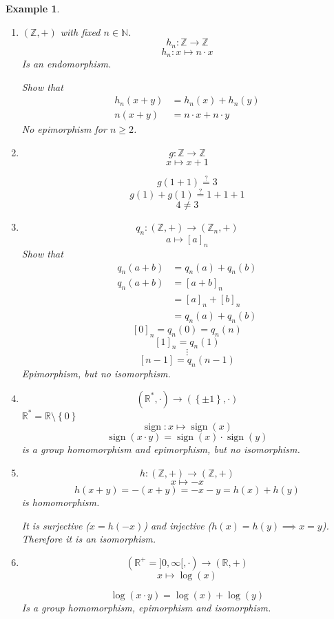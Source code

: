 \documentclass[a4paper,landscape,twocolumn]{article}
\newcommand\set[1]{\left\{#1\right\}}
\newtheorem{ex}{Example}[section]
\begin{document}
\begin{ex}
  \begin{enumerate}
    \item $(\mathbb Z, +)$ with fixed $n \in \mathbb N$.
      \[ h_n: \mathbb Z \rightarrow \mathbb Z \]
      \[ h_n: x \mapsto n \cdot x \]
      Is an endomorphism.

      Show that
      \begin{align*}
        h_n(x + y) &= h_n(x) + h_n(y) \\
        n(x + y) &= n\cdot x + n \cdot y
      \end{align*}
      No epimorphism for $n \geq 2$.
    \item
      \[ g: \mathbb Z \rightarrow \mathbb Z \]
      \[ x \mapsto x + 1 \]

      \[ g(1 + 1) \stackrel?= 3 \]
      \[ g(1) + g(1) \stackrel?= 1 + 1 +1 \]
      \[ 4 \neq 3 \]
    \item
      \[ q_n: (\mathbb Z, +) \rightarrow (\mathbb Z_n, +) \]
      \[ a \mapsto [a]_n \]
      Show that
      \begin{align*}
        q_n(a + b) &= q_n(a) + q_n(b) \\
        q_n(a + b) &= [a + b]_n \\
                   &= [a]_n + [b]_n \\
                   &= q_n(a) + q_n(b)
      \end{align*}
      \[ [0]_n = q_n(0) = q_n(n) \]
      \[ [1]_n = q_n(1) \]
      \[ \vdots \]
      \[ [n-1] = q_n(n-1) \]
      Epimorphism, but no isomorphism.
    \item
      \[ (\mathbb R^*, \cdot) \rightarrow (\set{\pm 1}, \cdot) \]
      $\mathbb R^* = \mathbb R \setminus \set{0}$
      \[ \operatorname{sign}: x \mapsto \operatorname{sign}(x) \]
      \[ \operatorname{sign}(x\cdot y) = \operatorname{sign}(x) \cdot \operatorname{sign}(y) \]
      is a group homomorphism and epimorphism, but no isomorphism.
    \item
      \[ h: (\mathbb Z, +) \rightarrow (\mathbb Z, +) \]
      \[ x \mapsto -x \]
      \[ h(x + y) = -(x + y) = -x-y = h(x) + h(y) \]
      is homomorphism.

      It is surjective ($x = h(-x)$) and injective ($h(x) = h(y) \implies x = y$).
      Therefore it is an isomorphism.
    \item
      \[ (\mathbb R^+ = ]0, \infty[, \cdot) \rightarrow (\mathbb R, +) \]
      \[ x \mapsto \log(x) \]

      \[ \log(x \cdot y) = \log(x) + \log(y) \]
      Is a group homomorphism, epimorphism and isomorphism.
  \end{enumerate}
\end{ex}
\end{document}
